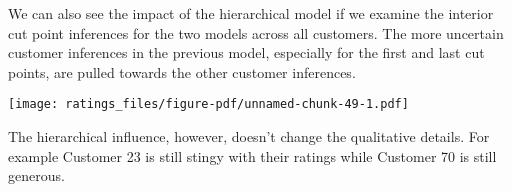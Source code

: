 \documentclass[
  letterpaper,
  DIV=11,
  numbers=noendperiod]{scrartcl}
\newenvironment{Shaded}{\begin{snugshade}}{\end{snugshade}}
\newcommand{\AttributeTok}[1]{\textcolor[rgb]{0.40,0.45,0.13}{#1}}
\newcommand{\ControlFlowTok}[1]{\textcolor[rgb]{0.00,0.23,0.31}{#1}}
\newcommand{\DecValTok}[1]{\textcolor[rgb]{0.68,0.00,0.00}{#1}}
\newcommand{\FunctionTok}[1]{\textcolor[rgb]{0.28,0.35,0.67}{#1}}
\newcommand{\NormalTok}[1]{\textcolor[rgb]{0.00,0.23,0.31}{#1}}
\newcommand{\OtherTok}[1]{\textcolor[rgb]{0.00,0.23,0.31}{#1}}
\newcommand{\SpecialCharTok}[1]{\textcolor[rgb]{0.37,0.37,0.37}{#1}}
\newcommand{\StringTok}[1]{\textcolor[rgb]{0.13,0.47,0.30}{#1}}
\begin{document}
We can also see the impact of the hierarchical model if we examine the
interior cut point inferences for the two models across all customers.
The more uncertain customer inferences in the previous model, especially
for the first and last cut points, are pulled towards the other customer
inferences.

\begin{Shaded}
\end{Shaded}

\texttt{[image: ratings\_files/figure-pdf/unnamed-chunk-49-1.pdf]}

The hierarchical influence, however, doesn't change the qualitative
details. For example Customer 23 is still stingy with their ratings
while Customer 70 is still generous.
\end{document}

